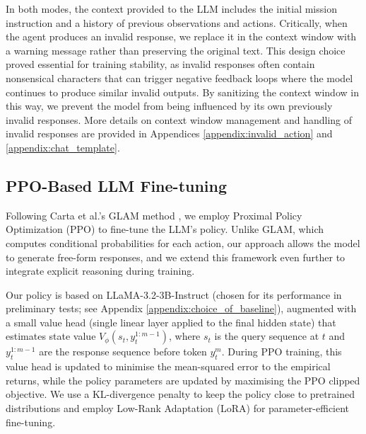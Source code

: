 \documentclass[11pt,a4paper]{article}
\begin{document}
In both modes, the context provided to the LLM includes the initial mission instruction and a history of previous observations and actions. Critically, when the agent produces an invalid response, we replace it in the context window with a warning message rather than preserving the original text. This design choice proved essential for training stability, as invalid responses often contain nonsensical characters that can trigger negative feedback loops where the model continues to produce similar invalid outputs. By sanitizing the context window in this way, we prevent the model from being influenced by its own previously invalid responses. More details on context window management and handling of invalid responses are provided in Appendices \ref{appendix:invalid_action} and \ref{appendix:chat_template}.

\subsection{PPO-Based LLM Fine-tuning}
\label{subsec: PPO-based-LLM-fine-tuning}

Following Carta et al.'s GLAM method \cite{carta2023grounding}, we employ Proximal Policy Optimization (PPO) \cite{schulman2017proximal} to fine-tune the LLM's policy. 
Unlike GLAM, which computes conditional probabilities for each action, our approach allows the model to generate free-form responses, and we extend this framework even further to integrate explicit reasoning during training.

Our policy is based on LLaMA-3.2-3B-Instruct (chosen for its performance in preliminary tests; see Appendix \ref{appendix:choice_of_baseline}), 
augmented with a small value head (single linear layer applied to the final hidden state) that estimates state value $V_\phi(s_t, y_t^{1:m-1})$, where $s_t$ is the query sequence at $t$ and $y_t^{1:m-1}$ are the response sequence before token $y_t^m$.
During PPO training, this value head is updated to minimise the mean-squared error to the empirical returns, 
while the policy parameters are updated by maximising the PPO clipped objective.
We use a KL-divergence penalty to keep the policy close to pretrained distributions and employ Low-Rank Adaptation (LoRA) \cite{hu2021lora} for parameter-efficient fine-tuning.
\end{document}
